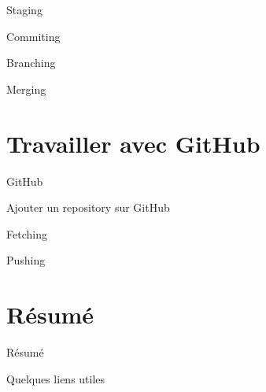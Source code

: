 \documentclass{beamer}
\begin{document}
\begin{frame}{Staging}
	
\end{frame}

\begin{frame}{Commiting}
	
\end{frame}

\begin{frame}{Branching}
	
\end{frame}

\begin{frame}{Merging}
	
\end{frame}

\section{Travailler avec GitHub}
\begin{frame}{GitHub}
	
\end{frame}

\begin{frame}{Ajouter un repository sur GitHub}

\end{frame}

\begin{frame}{Fetching}
	
\end{frame}

\begin{frame}{Pushing}
	
\end{frame}


\section{Résumé}
\begin{frame}{Résumé}

\end{frame}

\begin{frame}{Quelques liens utiles}
	
\end{frame}
\end{document}
